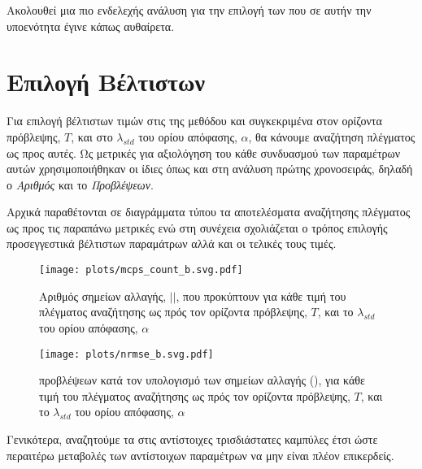 \par Ακολουθεί μια πιο ενδελεχής ανάλυση για την επιλογή των  που σε αυτήν την υποενότητα έγινε κάπως αυθαίρετα.

\section{Επιλογή Βέλτιστων }

Για επιλογή βέλτιστων τιμών στις  της μεθόδου και συγκεκριμένα στον ορίζοντα πρόβλεψης, $T$, και στο $\lambda_{std}$ του ορίου απόφασης, $\alpha$, θα κάνουμε αναζήτηση πλέγματος ως προς αυτές. Ως μετρικές για αξιολόγηση του κάθε συνδυασμού των παραμέτρων αυτών χρησιμοποιήθηκαν οι ίδιες όπως και στη ανάλυση πρώτης χρονοσειράς, δηλαδή ο \textit{Αριθμός } και το \textit{ Προβλέψεων}.

Αρχικά παραθέτονται σε διαγράμματα τύπου  τα αποτελέσματα αναζήτησης πλέγματος ως προς τις παραπάνω μετρικές ενώ στη συνέχεια σχολιάζεται ο τρόπος επιλογής προσεγγεστικά βέλτιστων παραμάτρων αλλά και οι τελικές τους τιμές.

\begin{figure}[H]
    \begin{center}
        \texttt{[image: plots/mcps\_count\_b.svg.pdf]}
        \caption{Αριθμός σημείων αλλαγής, $\vert$$\vert$, που προκύπτουν για κάθε τιμή του πλέγματος αναζήτησης ως πρός τον ορίζοντα πρόβλεψης, $T$, και το $\lambda_{std}$ του ορίου απόφασης, $\alpha$}
        \label{fig:mcps_count_b}
    \end{center}
\end{figure}

\begin{figure}[H]
    \begin{center}
        \texttt{[image: plots/nrmse\_b.svg.pdf]}
        \caption{ προβλέψεων κατά τον υπολογισμό των σημείων αλλαγής (), για κάθε τιμή του πλέγματος αναζήτησης ως πρός τον ορίζοντα πρόβλεψης, $T$, και το $\lambda_{std}$ του ορίου απόφασης, $\alpha$}
        \label{fig:nrmse_b}
    \end{center}
\end{figure}

\par Γενικότερα, αναζητούμε τα  στις αντίστοιχες τρισδιάστατες καμπύλες έτσι ώστε περαιτέρω μεταβολές των αντίστοιχων παραμέτρων να μην είναι πλέον επικερδείς.

